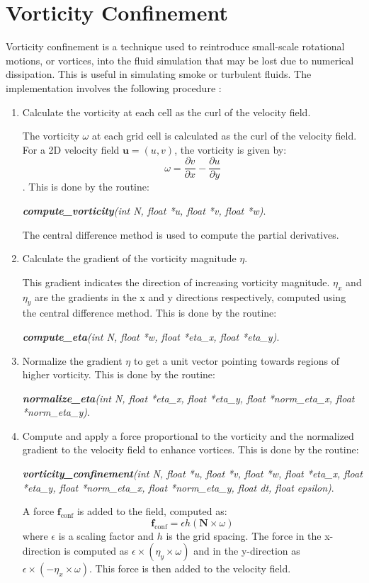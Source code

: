 \section{Vorticity Confinement}
Vorticity confinement is a technique used to reintroduce small-scale rotational motions, or vortices, into the fluid simulation that may be lost due to numerical dissipation. This is useful in simulating smoke or turbulent fluids. The implementation involves the following procedure \cite{fedkiw2001visual}:

\begin{enumerate}
    \item Calculate the vorticity at each cell as the curl of the velocity field. 
    
    The vorticity \( \omega \) at each grid cell is calculated as the curl of the velocity field. For a 2D velocity field \(\mathbf{u} = (u, v)\), the vorticity is given by: \[ \omega = \frac{\partial v}{\partial x} - \frac{\partial u}{\partial y} \]. This is done by the routine: 
    
    \emph{\textbf{compute\_vorticity}(int N, float *u, float *v, float *w)}. 
    
    The central difference method is used to compute the partial derivatives.

    \item Calculate the gradient of the vorticity magnitude $\eta$. 
    
    This gradient indicates the direction of increasing vorticity magnitude. \(\eta_x\) and \(\eta_y\) are the gradients in the x and y directions respectively, computed using the central difference method. This is done by the routine:
    
    \emph{\textbf{compute\_eta}(int N, float *w, float *eta\_x, float *eta\_y)}.

    \item Normalize the gradient $\eta$ to get a unit vector pointing towards regions of higher vorticity. This is done by the routine: 
    
    \emph{\textbf{normalize\_eta}(int N, float *eta\_x, float *eta\_y, float *norm\_eta\_x, float *norm\_eta\_y)}.

    \item Compute and apply a force proportional to the vorticity and the normalized gradient to the velocity field to enhance vortices. This is done by the routine: 
    
    \emph{\textbf{vorticity\_confinement}(int N, float *u, float *v, float *w, float *eta\_x, float *eta\_y, float *norm\_eta\_x, float *norm\_eta\_y, float dt, float epsilon)}. 
    
    A force \(\mathbf{f}_{\text{conf}}\) is added to the field, computed as: \[ \mathbf{f}_{\text{conf}} = \epsilon h (\mathbf{N} \times \omega) \] where \(\epsilon\) is a scaling factor and \(h\) is the grid spacing. The force in the x-direction is computed as \( \epsilon \times (\eta_y \times \omega) \) and in the y-direction as \( \epsilon \times (-\eta_x \times \omega) \). This force is then added to the velocity field.
\end{enumerate}





